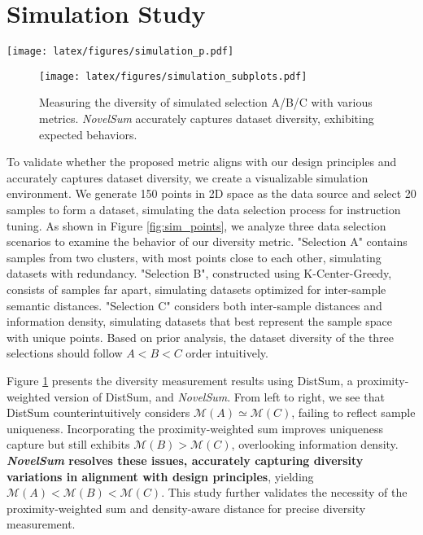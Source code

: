 \section{Simulation Study}
\begin{figure*}[!t]
    \centering
        \texttt{[image: latex/figures/simulation\_p.pdf]}
    \caption{Simulating data selection in a 2D sample space: Selection A represents datasets with redundancy, Selection B optimizes inter-sample distances, and Selection C accounts for both distances and density, which prior analysis suggests yields the highest diversity.}
    \label{fig:sim_points}
    \vspace{-4mm}
\end{figure*}

\begin{figure}[!t]
    \centering
        \texttt{[image: latex/figures/simulation\_subplots.pdf]}
    \caption{Measuring the diversity of simulated selection A/B/C with various metrics. \textit{NovelSum} accurately captures dataset diversity, exhibiting expected behaviors.}
    \label{fig:sim_res}
    \vspace{-2mm}
\end{figure}


To validate whether the proposed metric aligns with our design principles and accurately captures dataset diversity, we create a visualizable simulation environment. We generate 150 points in 2D space as the data source and select 20 samples to form a dataset, simulating the data selection process for instruction tuning. As shown in Figure \ref{fig:sim_points}, we analyze three data selection scenarios to examine the behavior of our diversity metric. "Selection A" contains samples from two clusters, with most points close to each other, simulating datasets with redundancy. "Selection B", constructed using K-Center-Greedy, consists of samples far apart, simulating datasets optimized for inter-sample semantic distances. "Selection C" considers both inter-sample distances and information density, simulating datasets that best represent the sample space with unique points. Based on prior analysis, the dataset diversity of the three selections should follow $A<B<C$ order intuitively.

Figure \ref{fig:sim_res} presents the diversity measurement results using DistSum, a proximity-weighted version of DistSum, and \textit{NovelSum}. From left to right, we see that DistSum counterintuitively considers $\mathcal{M}(A) \simeq \mathcal{M}(C)$, failing to reflect sample uniqueness. Incorporating the proximity-weighted sum improves uniqueness capture but still exhibits $\mathcal{M}(B) > \mathcal{M}(C)$, overlooking information density. \textbf{\textit{NovelSum} resolves these issues, accurately capturing diversity variations in alignment with design principles}, yielding $\mathcal{M}(A) < \mathcal{M}(B) < \mathcal{M}(C)$. This study further validates the necessity of the proximity-weighted sum and density-aware distance for precise diversity measurement.





